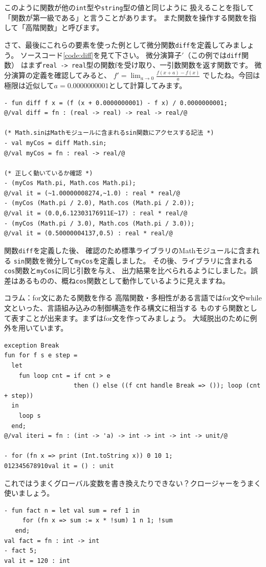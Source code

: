 \documentclass[11pt,a4paper]{article}
\begin{document}
このように関数が他の\lstinline{int}型や\lstinline{string}型の値と同じように
扱えることを指して「関数が第一級である」と言うことがあります。
また関数を操作する関数を指して「高階関数」と呼びます。

さて、最後にこれらの要素を使った例として微分関数\lstinline{diff}を定義してみましょう。
ソースコード\ref{code:diff}を見て下さい。
微分演算子$'$（この例では\lstinline{diff}関数）
はまず\lstinline{real -> real}型の関数fを受け取り、一引数関数を返す関数です。
微分演算の定義を確認してみると、
$f' = \lim_{a \to 0}\frac{f(x+a) - f(x)}{a}$
でしたね。今回は極限は近似して$a = 0.0000000001$として計算してみます。

\begin{lstlisting}[caption=高階関数の例,label=code:diff]
- fun diff f x = (f (x + 0.0000000001) - f x) / 0.0000000001;
@/val diff = fn : (real -> real) -> real -> real/@

(* Math.sinはMathモジュールに含まれるsin関数にアクセスする記法 *)
- val myCos = diff Math.sin;
@/val myCos = fn : real -> real/@

(* 正しく動いているか確認 *)
- (myCos Math.pi, Math.cos Math.pi);
@/val it = (~1.00000008274,~1.0) : real * real/@
- (myCos (Math.pi / 2.0), Math.cos (Math.pi / 2.0));
@/val it = (0.0,6.12303176911E~17) : real * real/@
- (myCos (Math.pi / 3.0), Math.cos (Math.pi / 3.0));
@/val it = (0.50000004137,0.5) : real * real/@
\end{lstlisting}

関数\lstinline{diff}を定義した後、
確認のため標準ライブラリのMathモジュールに含まれる
\lstinline{sin}関数を微分して\lstinline{myCos}を定義しました。
その後、ライブラリに含まれる\lstinline{cos}関数と\lstinline{myCos}に同じ引数を与え、
出力結果を比べられるようにしました。誤差はあるものの、概ね\lstinline{cos}関数として動作しているように見えますね。

\begin{itembox}[l]{コラム：for文にあたる関数を作る}
高階関数・多相性がある言語ではfor文やwhile文といった、言語組み込みの制御構造を作る構文に相当する
ものすら関数として表すことが出来ます。まずはfor文を作ってみましょう。
大域脱出のために例外を用いています。

\begin{lstlisting}[caption=for文相当の関数,label=code:for]
exception Break
fun for f s e step =
  let
    fun loop cnt = if cnt > e
                   then () else ((f cnt handle Break => ()); loop (cnt + step))
  in
    loop s
  end;
@/val iteri = fn : (int -> 'a) -> int -> int -> int -> unit/@

- for (fn x => print (Int.toString x)) 0 10 1;
012345678910val it = () : unit
\end{lstlisting}

これではうまくグローバル変数を書き換えたりできない？クロージャーをうまく使いましょう。
\begin{lstlisting}[caption=関数forを使ってみる,label=code:use-iteri]
- fun fact n = let val sum = ref 1 in
     for (fn x => sum := x * !sum) 1 n 1; !sum
   end;
val fact = fn : int -> int
- fact 5;
val it = 120 : int
\end{lstlisting}

\end{itembox}
\end{document}
